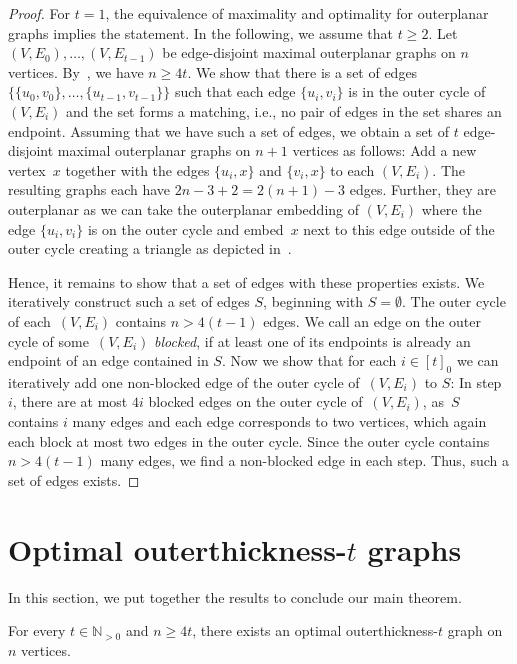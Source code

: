 \documentclass[unicode,runningheads,envcountsame,a4paper,dvipsnames,12pt]{llncs}
\newcommand{\N}{\mathbb{N}}
\begin{document}
	\begin{proof}
		For $t = 1$, the equivalence of maximality and optimality for outerplanar graphs implies the statement. In the following, we assume that $t \ge 2$. Let~\((V,E_0), \dots, (V,E_{t-1})\) be edge-disjoint maximal outerplanar graphs on \(n\) vertices. By~, we have $n \ge 4t$. We show that there is a set of edges~\(\{\{u_0,v_0\}, \dots, \{u_{t-1},v_{t-1}\}\}\) such that each edge \(\{u_i,v_i\}\) is in the outer cycle of~\((V,E_i)\) and the set forms a matching, i.e., no pair of edges in the set shares an endpoint. Assuming that we have such a set of edges, we obtain a set of \(t\) edge-disjoint maximal outerplanar graphs on \(n+1\) vertices as follows: Add a new vertex~\(x\) together with the edges \(\{u_i,x\}\) and \(\{v_i,x\}\) to each \((V,E_i)\). The resulting graphs each have \(2n-3+2=2(n+1)-3\) edges. Further, they are outerplanar as we can take the outerplanar embedding of \((V,E_i)\) where the edge \(\{u_i,v_i\}\) is on the outer cycle and embed~\(x\) next to this edge outside of the outer cycle creating a triangle as depicted in~.
		
		Hence, it remains to show that a set of edges with these properties exists.
		We iteratively construct such a set of edges \(S\), beginning with \(S=\emptyset\). The outer cycle of each~\((V,E_i)\) contains \(n>4(t-1)\) edges. We call an edge on the outer cycle of some~\((V,E_i)\) \emph{blocked}, if at least one of its endpoints is already an endpoint of an edge contained in \(S\). Now we show that for each \({i \in [t]_0}\) we can iteratively add one non-blocked edge of the outer cycle of~\((V,E_i)\) to \(S\):
		In step~\(i\), there are at most \(4i\) blocked edges on the outer cycle of~\((V,E_i)\), as~\(S\) contains \(i\) many edges and each edge corresponds to two vertices, which again each block at most two edges in the outer cycle. Since the outer cycle contains \(n>4(t-1)\) many edges, we find a non-blocked edge in each step. Thus, such a set of edges exists.
	\end{proof}
	
	\section{Optimal outerthickness-$t$ graphs}
	
	In this section, we put together the results to conclude our main theorem.
	
	\begin{theorem}
		\label{thm:main}
		For every $t \in \N_{>0}$ and $n \geq 4t$, there exists an optimal outerthick\-ness-$t$ graph on $n$ vertices.
	\end{theorem}
	
\end{document}
